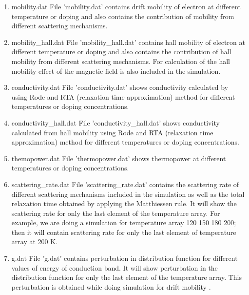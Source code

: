 \documentclass[12pt]{article}
\begin{document}
\begin{enumerate}

\item mobility.dat
\newline File 'mobility.dat' contains drift mobility of electron at different temperature or doping and also contains the contribution of mobility from different scattering mechanisms.

\item mobility\_hall.dat
\newline File 'mobility\_hall.dat' contains hall mobility of electron at different temperature or doping and also contains the contribution of hall mobility from different scattering mechanisms. For calculation of the hall mobility effect of the magnetic field is also included in the simulation.

\item conductivity.dat
\newline File 'conductivity.dat' shows conductivity calculated by using Rode and RTA (relaxation time approximation) method for different temperatures or doping concentrations. 

\item conductivity\_hall.dat 
\newline File 'conductivity\_hall.dat' shows conductivity calculated from hall mobility using Rode and RTA (relaxation time approximation) method for different temperatures or doping concentrations. 

\item themopower.dat
\newline File 'thermopower.dat' shows thermopower at different temperatures or doping concentrations.
  
\item scattering\_rate.dat
\newline File 'scattering\_rate.dat' contains the scattering rate of different scattering mechanisms included in the simulation as well as the total relaxation time obtained by applying the Matthiessen rule. It will show the scattering rate for only the last element of the temperature array. For example, we are doing a simulation for temperature array 120 150 180 200; then it will contain scattering rate for only the last element of temperature array at 200 K. 

\item g.dat
\newline File 'g.dat' contains perturbation in distribution function for different values of energy of conduction band. It will show perturbation in the distribution function for only the last element of the temperature array. This perturbation is obtained while doing simulation for drift mobility \cite{rode1}.


\end{enumerate}
\end{document}
